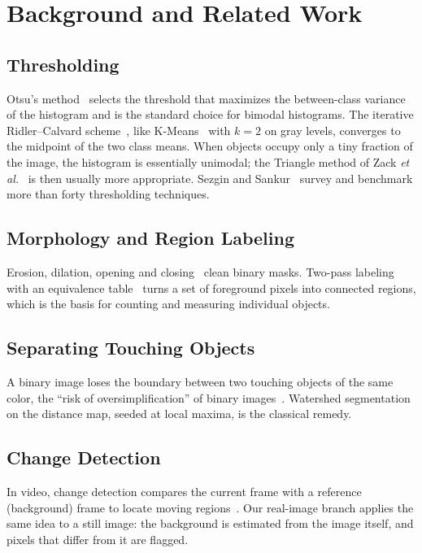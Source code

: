 \documentclass[conference,a4paper]{IEEEtran}
\begin{document}
\section{Background and Related Work}
\subsection{Thresholding}
Otsu's method~\cite{otsu1979} selects the threshold that maximizes the between-class variance of the histogram and is the standard choice for bimodal histograms. The iterative Ridler--Calvard scheme~\cite{ridler1978}, like K-Means~\cite{macqueen1967} with $k=2$ on gray levels, converges to the midpoint of the two class means. When objects occupy only a tiny fraction of the image, the histogram is essentially unimodal; the Triangle method of Zack \emph{et al.}~\cite{zack1977} is then usually more appropriate. Sezgin and Sankur~\cite{sezgin2004} survey and benchmark more than forty thresholding techniques.

\subsection{Morphology and Region Labeling}
Erosion, dilation, opening and closing~\cite{serra1982} clean binary masks. Two-pass labeling with an equivalence table~\cite{rosenfeld1966} turns a set of foreground pixels into connected regions, which is the basis for counting and measuring individual objects.

\subsection{Separating Touching Objects}
A binary image loses the boundary between two touching objects of the same color, the ``risk of oversimplification'' of binary images~\cite{bovik2005handbook}. Watershed segmentation~\cite{vincent1991,meyer1994} on the distance map, seeded at local maxima, is the classical remedy.

\subsection{Change Detection}
In video, change detection compares the current frame with a reference (background) frame to locate moving regions~\cite{radke2005}. Our real-image branch applies the same idea to a still image: the background is estimated from the image itself, and pixels that differ from it are flagged.
\end{document}
